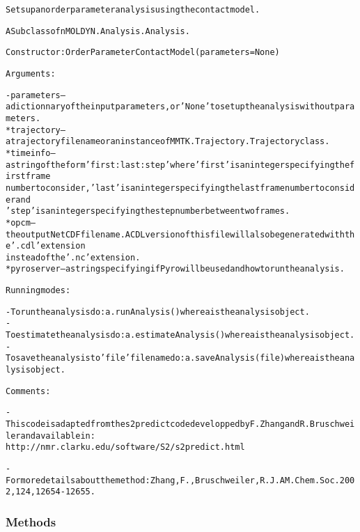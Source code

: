 \begin{alltt}
Sets up an order parameter analysis using the contact model .

A Subclass of nMOLDYN.Analysis.Analysis. 

Constructor: OrderParameterContactModel({\textbar}parameters{\textbar} = None)

Arguments:

    - {\textbar}parameters{\textbar} -- a dictionnary of the input parameters, or 'None' to set up the analysis without parameters.
        * trajectory -- a trajectory file name or an instance of MMTK.Trajectory.Trajectory class.
        * timeinfo   -- a string of the form 'first:last:step' where 'first' is an integer specifying the first frame 
                        number to consider, 'last' is an integer specifying the last frame number to consider and 
                        'step' is an integer specifying the step number between two frames.
        * opcm       -- the output NetCDF file name. A CDL version of this file will also be generated with the '.cdl' extension
                        instead of the '.nc' extension.
        * pyroserver -- a string specifying if Pyro will be used and how to run the analysis.

Running modes:

    - To run the analysis do: a.runAnalysis() where a is the analysis object.
    - To estimate the analysis do: a.estimateAnalysis() where a is the analysis object.
    - To save the analysis to 'file' file name do: a.saveAnalysis(file) where a is the analysis object.

Comments:        
    
    - This code is adapted from the s2predict code developped by F. Zhang and R. Bruschweiler and available in:
      http://nmr.clarku.edu/software/S2/s2predict.html

    - For more details about the method: Zhang, F., Bruschweiler, R. J. AM. Chem. Soc. 2002, 124, 12654-12655.
\end{alltt}



  \subsubsection{Methods}

